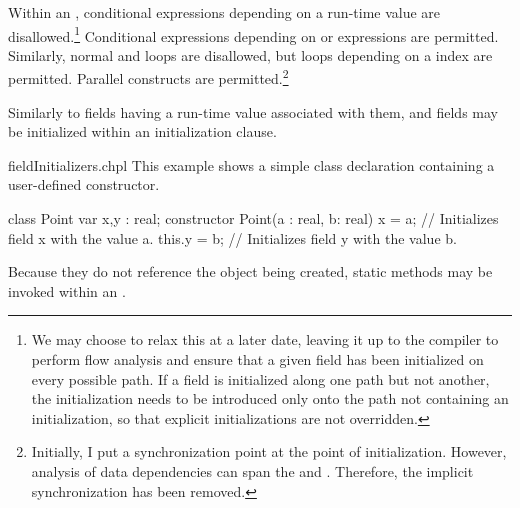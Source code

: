 Within an , conditional expressions depending on a
run-time value are disallowed.\footnote{We may choose to relax this at a later
date, leaving it up to the compiler to perform flow analysis and ensure that a
given field has been initialized on every possible path.  If a field is
initialized along one path but not another, the initialization needs to be
introduced only onto the path not containing an initialization, so that explicit
initializations are not overridden.}  Conditional expressions depending
on  or  expressions are permitted.  Similarly,
normal  and  loops are disallowed, but loops depending on
a  index are permitted.  Parallel constructs are
permitted.\footnote{Initially, I put a synchronization point at the point of
initialization.  However, analysis of data dependencies can span
the  and .  Therefore, the
implicit synchronization has been removed.}

Similarly to fields having a run-time value associated with them, 
and  fields may be initialized within an initialization clause.

\begin{chapelexample}{fieldInitializers.chpl}
This example shows a simple class declaration containing a user-defined constructor.
\begin{chapel}
class Point { 
  var x,y : real; 
  constructor Point(a : real, b: real)
  { x = a; 			// Initializes field x with the value a.
    this.y = b;     // Initializes field y with the value b.
  }
  {}
}
\end{chapel}
\end{chapelexample}
\noindent
Because they do not reference the object being created, static methods may be
invoked within an .

